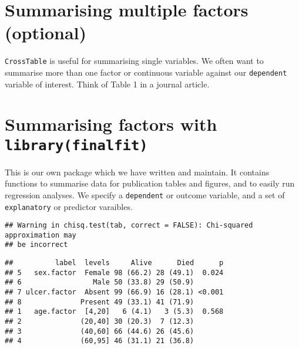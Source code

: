 \documentclass[]{book}
\makeatletter
\newenvironment{Shaded}{\begin{snugshade}}{\end{snugshade}}
\newcommand{\KeywordTok}[1]{\textcolor[rgb]{0.13,0.29,0.53}{\textbf{#1}}}
\newcommand{\DataTypeTok}[1]{\textcolor[rgb]{0.13,0.29,0.53}{#1}}
\newcommand{\StringTok}[1]{\textcolor[rgb]{0.31,0.60,0.02}{#1}}
\newcommand{\OtherTok}[1]{\textcolor[rgb]{0.56,0.35,0.01}{#1}}
\newcommand{\OperatorTok}[1]{\textcolor[rgb]{0.81,0.36,0.00}{\textbf{#1}}}
\newcommand{\NormalTok}[1]{#1}
\newenvironment{kframe}{%
\medskip{}
\setlength{\fboxsep}{.8em}
 \def\at@end@of@kframe{}%
 \ifinner\ifhmode%
  \def\at@end@of@kframe{\end{minipage}}%
  \begin{minipage}{\columnwidth}%
 \fi\fi%
 \def\FrameCommand##1{\hskip\@totalleftmargin \hskip-\fboxsep
 \colorbox{shadecolor}{##1}\hskip-\fboxsep
     \hskip-\linewidth \hskip-\@totalleftmargin \hskip\columnwidth}%
 \MakeFramed {\advance\hsize-\width
   \@totalleftmargin\z@ \linewidth\hsize
   \@setminipage}}%
 {\par\unskip\endMakeFramed%
 \at@end@of@kframe}
\renewenvironment{Shaded}{\begin{kframe}}{\end{kframe}}
\theoremstyle{definition}
\theoremstyle{definition}
\theoremstyle{definition}
\theoremstyle{remark}
\makeatother
\begin{document}
\section{Summarising multiple factors
(optional)}\label{summarising-multiple-factors-optional}

\texttt{CrossTable} is useful for summarising single variables. We often
want to summarise more than one factor or continuous variable against
our \texttt{dependent} variable of interest. Think of Table 1 in a
journal article.

\section{\texorpdfstring{Summarising factors with
\texttt{library(finalfit)}}{Summarising factors with library(finalfit)}}\label{summarising-factors-with-libraryfinalfit}

This is our own package which we have written and maintain. It contains
functions to summarise data for publication tables and figures, and to
easily run regression analyses. We specify a \texttt{dependent} or
outcome variable, and a set of \texttt{explanatory} or predictor
varaibles.

\begin{Shaded}
\end{Shaded}

\begin{verbatim}
## Warning in chisq.test(tab, correct = FALSE): Chi-squared approximation may
## be incorrect
\end{verbatim}

\begin{verbatim}
##          label  levels     Alive      Died      p
## 5   sex.factor  Female 98 (66.2) 28 (49.1)  0.024
## 6                 Male 50 (33.8) 29 (50.9)       
## 7 ulcer.factor  Absent 99 (66.9) 16 (28.1) <0.001
## 8              Present 49 (33.1) 41 (71.9)       
## 1   age.factor  [4,20]   6 (4.1)   3 (5.3)  0.568
## 2              (20,40] 30 (20.3)  7 (12.3)       
## 3              (40,60] 66 (44.6) 26 (45.6)       
## 4              (60,95] 46 (31.1) 21 (36.8)
\end{verbatim}
\end{document}
